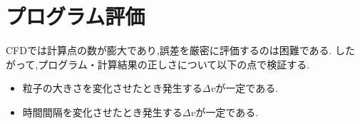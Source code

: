 \section{プログラム評価}
\label{sec:eval}
CFDでは計算点の数が膨大であり,誤差を厳密に評価するのは困難である.
したがって,プログラム・計算結果の正しさについて以下の点で検証する.
\begin{itemize}
  \item 粒子の大きさを変化させたとき発生する$\Delta{v}$が一定である.
  \item 時間間隔を変化させたとき発生する$\Delta{v}$が一定である.
\end{itemize}